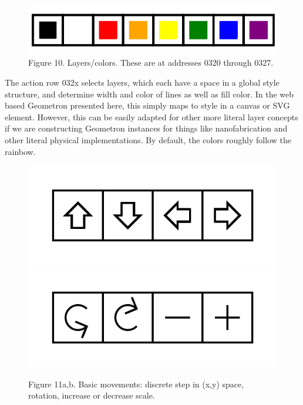 \documentclass[11pt]{article}
\begin{document}
\begin{figure}

\includegraphics[width=\linewidth]{figures/figure10_layers.png}

\caption{Figure 10. Layers/colors.  These are at addresses 0320 through 0327.}
\end{figure}




    The action row 032x selects layers, which each have a space in a global style structure, and determine width and color of lines as well as fill color. In the web based Geometron presented here, this simply maps to style in a canvas or SVG element.  However, this can be easily adapted for other more literal layer concepts if we are constructing Geometron instances for things like nanofabrication and other literal physical implementations.  By default, the colors roughly follow the rainbow.




\begin{figure}

\includegraphics[width=\linewidth]{figures/figure11a_movements.png}
\includegraphics[width=\linewidth]{figures/figure11b_rotationscale.png}

\caption{Figure 11a,b. Basic movements: discrete step in (x,y) space, rotation, increase or decrease scale.}
\end{figure}
\end{document}
